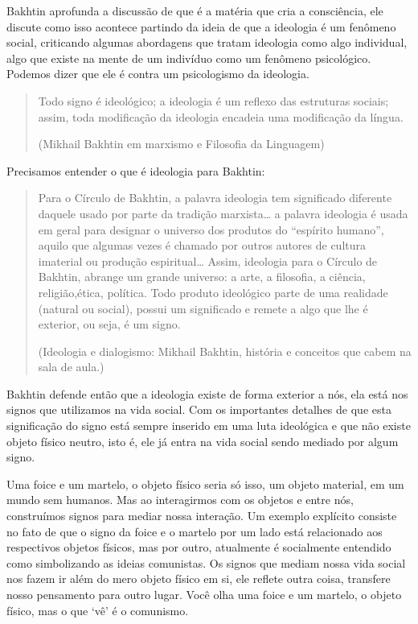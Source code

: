 Bakhtin aprofunda a discussão de que é a matéria que cria a consciência, ele discute como isso acontece partindo da ideia de que a ideologia é um fenômeno social, criticando algumas abordagens que tratam ideologia como algo individual, algo que existe na mente de um indivíduo como um fenômeno psicológico. Podemos dizer que ele é contra um psicologismo da ideologia.

\begin{quote}
Todo signo é ideológico; a ideologia é um reflexo das estruturas sociais; assim, toda modificação da ideologia encadeia uma modificação da língua.

(Mikhail Bakhtin em marxismo e Filosofia da Linguagem)
\end{quote}

Precisamos entender o que é ideologia para Bakhtin:

\begin{quote}
Para o Círculo de Bakhtin, a palavra ideologia tem significado diferente daquele usado por parte da tradição marxista… a palavra ideologia é usada em geral para designar o universo dos produtos do “espírito humano”, aquilo que algumas vezes é chamado por outros autores de cultura imaterial ou produção espiritual… Assim, ideologia para o Círculo de Bakhtin, abrange um grande universo: a arte, a filosofia, a ciência, religião,ética, política. Todo produto ideológico parte de uma realidade (natural ou social), possui um significado e remete a algo que lhe é exterior, ou seja, é um signo.

(Ideologia e dialogismo: Mikhail Bakhtin, história e conceitos que cabem na sala de aula.)
\end{quote}

Bakhtin defende então que a ideologia existe de forma exterior a nós, ela está nos signos que utilizamos na vida social. Com os importantes detalhes de que esta significação do signo está sempre inserido em uma luta ideológica e que não existe objeto físico neutro, isto é, ele já entra na vida social sendo mediado por algum signo.

Uma foice e um martelo, o objeto físico seria só isso, um objeto material, em um mundo sem humanos. Mas ao interagirmos com os objetos e entre nós, construímos signos para mediar nossa interação. Um exemplo explícito consiste no fato de que o signo da foice e o martelo por um lado está relacionado aos respectivos objetos físicos, mas por outro, atualmente é socialmente entendido como simbolizando as ideias comunistas. Os signos que mediam nossa vida social nos fazem ir além do mero objeto físico em si, ele reflete outra coisa, transfere nosso pensamento para outro lugar. Você olha uma foice e um martelo, o objeto físico, mas o que ‘vê’ é o comunismo.

